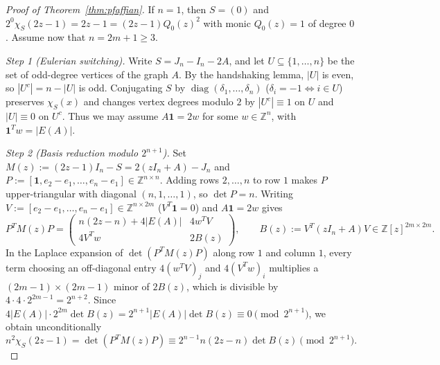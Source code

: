 \documentclass[11pt,reqno]{amsart}
\theoremstyle{definition}
\theoremstyle{remark}
\DeclareMathOperator{\diag}{diag}
\begin{document}
\begin{proof}[Proof of Theorem~\ref{thm:pfaffian}]
If $n = 1$, then $S = (0)$ and $2^0 \chi_S(2z - 1) = 2z - 1 = (2z - 1) Q_0(z)^2$ with monic $Q_0(z) = 1$ of degree $0$. Assume now that $n = 2m + 1 \ge 3$.

\emph{Step 1 (Eulerian switching).} Write $S = J_n - I_n - 2A$, and let $U \subseteq \{1, \dots, n\}$ be the set of odd-degree vertices of the graph $A$. By the handshaking lemma, $|U|$ is even, so $|U^c| = n - |U|$ is odd. Conjugating $S$ by $\diag(\delta_1, \dots, \delta_n)$ ($\delta_i = -1 \iff i \in U$) preserves $\chi_S(x)$ and changes vertex degrees modulo $2$ by $|U^c| \equiv 1$ on $U$ and $|U| \equiv 0$ on $U^c$. Thus we may assume $A\mathbf{1} = 2w$ for some $w \in \mathbb{Z}^n$, with $\mathbf{1}^T w = |E(A)|$.

\emph{Step 2 (Basis reduction modulo $2^{n+1}$).} Set $M(z) := (2z - 1)I_n - S = 2(zI_n + A) - J_n$ and $P := [\mathbf{1}, e_2 - e_1, \dots, e_n - e_1] \in \mathbb{Z}^{n \times n}$. Adding rows $2, \dots, n$ to row $1$ makes $P$ upper-triangular with diagonal $(n, 1, \dots, 1)$, so $\det P = n$. Writing $V := [e_2 - e_1, \dots, e_n - e_1] \in \mathbb{Z}^{n \times 2m}$ ($V^T \mathbf{1} = 0$) and $A\mathbf{1} = 2w$ gives
\[
  P^T M(z) P = \begin{pmatrix} n(2z - n) + 4|E(A)| & 4 w^T V \\ 4 V^T w & 2 B(z) \end{pmatrix}, \qquad B(z) := V^T (zI_n + A) V \in \mathbb{Z}[z]^{2m \times 2m}.
\]
In the Laplace expansion of $\det(P^T M(z) P)$ along row $1$ and column $1$, every term choosing an off-diagonal entry $4(w^T V)_j$ and $4(V^T w)_i$ multiplies a $(2m - 1) \times (2m - 1)$ minor of $2B(z)$, which is divisible by $4 \cdot 4 \cdot 2^{2m-1} = 2^{n+2}$. Since $4|E(A)| \cdot 2^{2m} \det B(z) = 2^{n+1}|E(A)|\det B(z) \equiv 0 \pmod{2^{n+1}}$, we obtain unconditionally
\begin{equation}\label{eq:laplace_mod}
  n^2 \chi_S(2z - 1) = \det(P^T M(z) P) \equiv 2^{n-1} n(2z - n) \det B(z) \pmod{2^{n+1}}.
\end{equation}


\end{proof}
\end{document}
